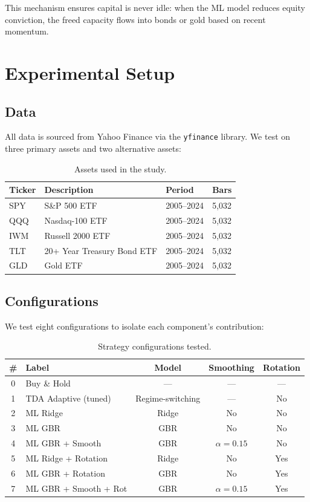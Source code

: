 \documentclass[11pt, a4paper]{article}
\begin{document}
This mechanism ensures capital is never idle: when the ML model reduces equity conviction, the freed capacity flows into bonds or gold based on recent momentum.

\section{Experimental Setup}

\subsection{Data}

All data is sourced from Yahoo Finance via the \texttt{yfinance} library. We test on three primary assets and two alternative assets:

\begin{table}[H]
\centering
\caption{Assets used in the study.}
\begin{tabular}{llll}
\toprule
\textbf{Ticker} & \textbf{Description} & \textbf{Period} & \textbf{Bars} \\
\midrule
SPY & S\&P 500 ETF & 2005--2024 & 5{,}032 \\
QQQ & Nasdaq-100 ETF & 2005--2024 & 5{,}032 \\
IWM & Russell 2000 ETF & 2005--2024 & 5{,}032 \\
TLT & 20+ Year Treasury Bond ETF & 2005--2024 & 5{,}032 \\
GLD & Gold ETF & 2005--2024 & 5{,}032 \\
\bottomrule
\end{tabular}
\end{table}

\subsection{Configurations}

We test eight configurations to isolate each component's contribution:

\begin{table}[H]
\centering
\caption{Strategy configurations tested.}
\label{tab:configs}
\begin{tabular}{clccc}
\toprule
\textbf{\#} & \textbf{Label} & \textbf{Model} & \textbf{Smoothing} & \textbf{Rotation} \\
\midrule
0 & Buy \& Hold & --- & --- & --- \\
1 & TDA Adaptive (tuned) & Regime-switching & --- & No \\
2 & ML Ridge & Ridge & No & No \\
3 & ML GBR & GBR & No & No \\
4 & ML GBR + Smooth & GBR & $\alpha = 0.15$ & No \\
5 & ML Ridge + Rotation & Ridge & No & Yes \\
6 & ML GBR + Rotation & GBR & No & Yes \\
7 & ML GBR + Smooth + Rot & GBR & $\alpha = 0.15$ & Yes \\
\bottomrule
\end{tabular}
\end{table}
\end{document}
